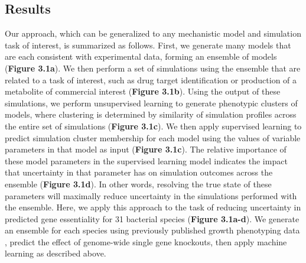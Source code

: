 \documentclass[11pt,onecolumn,notitlepage,openany,twoside]{book}
\begin{document}
\begin{refsection}
\section{Results}

Our approach, which can be generalized to any mechanistic model and simulation task of interest, is summarized as follows. First, we generate many models that are each consistent with experimental data, forming an ensemble of models (\textbf{Figure 3.1a}). We then perform a set of simulations using the ensemble that are related to a task of interest, such as drug target identification or production of a metabolite of commercial interest (\textbf{Figure 3.1b}). Using the output of these simulations, we perform unsupervised learning to generate phenotypic clusters of models, where clustering is determined by similarity of simulation profiles across the entire set of simulations (\textbf{Figure 3.1c}). We then apply supervised learning to predict simulation cluster membership for each model using the values of variable parameters in that model as input (\textbf{Figure 3.1c}). The relative importance of these model parameters in the supervised learning model indicates the impact that uncertainty in that parameter has on simulation outcomes across the ensemble (\textbf{Figure 3.1d}). In other words, resolving the true state of these parameters will maximally reduce uncertainty in the simulations performed with the ensemble. Here, we apply this approach to the task of reducing uncertainty in predicted gene essentiality for 31 bacterial species (\textbf{Figure 3.1a-d}). We generate an ensemble for each species using previously published growth phenotyping data \cite{Plata2015-bc}, predict the effect of genome-wide single gene knockouts, then apply machine learning as described above.


\end{refsection}
\end{document}
